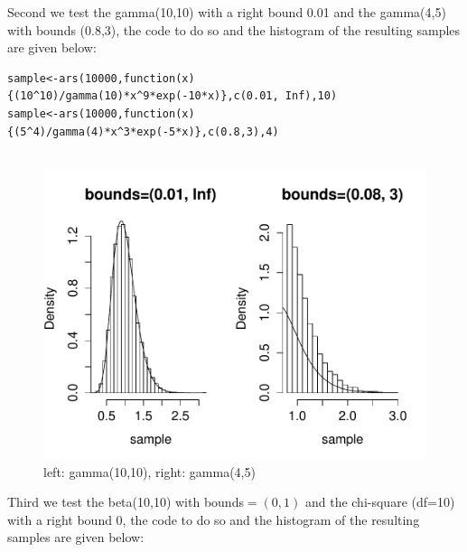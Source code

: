 \documentclass[11pt, oneside]{article}   	%
\begin{document}
Second we test the gamma(10,10) with a right bound 0.01 and the gamma(4,5) with bounds (0.8,3), the code to do so and the histogram of the resulting samples are given below:\newline

\begin{lstlisting}[frame=single]
sample<-ars(10000,function(x){(10^10)/gamma(10)*x^9*exp(-10*x)},c(0.01, Inf),10)
sample<-ars(10000,function(x){(5^4)/gamma(4)*x^3*exp(-5*x)},c(0.8,3),4)


\end{lstlisting}
\clearpage
\begin{figure}[htbp!]
 \centering
\caption{left: gamma(10,10), right: gamma(4,5)}
  \includegraphics[width=1.0\textwidth]{gamma}
\end{figure}




Third we test the beta(10,10) with bounds$=(0,1)$ and the chi-square (df=10) with a right bound 0, the code to do so and the histogram of the resulting samples are given below: \newline
\end{document}
